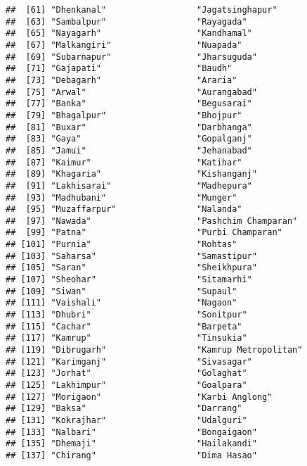 \documentclass[]{article}
\begin{document}
\begin{verbatim}
##  [61] "Dhenkanal"                  "Jagatsinghapur"            
##  [63] "Sambalpur"                  "Rayagada"                  
##  [65] "Nayagarh"                   "Kandhamal"                 
##  [67] "Malkangiri"                 "Nuapada"                   
##  [69] "Subarnapur"                 "Jharsuguda"                
##  [71] "Gajapati"                   "Baudh"                     
##  [73] "Debagarh"                   "Araria"                    
##  [75] "Arwal"                      "Aurangabad"                
##  [77] "Banka"                      "Begusarai"                 
##  [79] "Bhagalpur"                  "Bhojpur"                   
##  [81] "Buxar"                      "Darbhanga"                 
##  [83] "Gaya"                       "Gopalganj"                 
##  [85] "Jamui"                      "Jehanabad"                 
##  [87] "Kaimur"                     "Katihar"                   
##  [89] "Khagaria"                   "Kishanganj"                
##  [91] "Lakhisarai"                 "Madhepura"                 
##  [93] "Madhubani"                  "Munger"                    
##  [95] "Muzaffarpur"                "Nalanda"                   
##  [97] "Nawada"                     "Pashchim Champaran"        
##  [99] "Patna"                      "Purbi Champaran"           
## [101] "Purnia"                     "Rohtas"                    
## [103] "Saharsa"                    "Samastipur"                
## [105] "Saran"                      "Sheikhpura"                
## [107] "Sheohar"                    "Sitamarhi"                 
## [109] "Siwan"                      "Supaul"                    
## [111] "Vaishali"                   "Nagaon"                    
## [113] "Dhubri"                     "Sonitpur"                  
## [115] "Cachar"                     "Barpeta"                   
## [117] "Kamrup"                     "Tinsukia"                  
## [119] "Dibrugarh"                  "Kamrup Metropolitan"       
## [121] "Karimganj"                  "Sivasagar"                 
## [123] "Jorhat"                     "Golaghat"                  
## [125] "Lakhimpur"                  "Goalpara"                  
## [127] "Morigaon"                   "Karbi Anglong"             
## [129] "Baksa"                      "Darrang"                   
## [131] "Kokrajhar"                  "Udalguri"                  
## [133] "Nalbari"                    "Bongaigaon"                
## [135] "Dhemaji"                    "Hailakandi"                
## [137] "Chirang"                    "Dima Hasao"
\end{verbatim}
\end{document}
